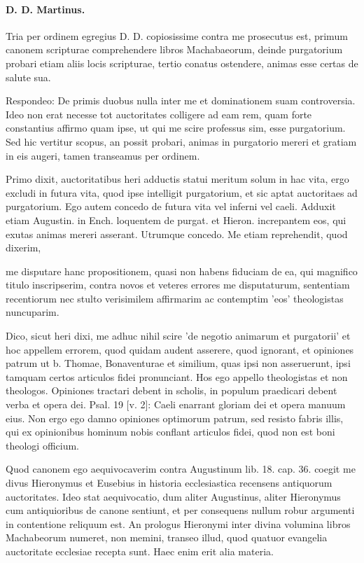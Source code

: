 \paragraph*{D. D. Martinus.}

Tria per ordinem egregius D. D. copiosissime contra me prosecutus est, primum canonem scripturae comprehendere libros Machabaeorum, deinde purgatorium probari etiam aliis locis scripturae, tertio conatus ostendere, animas esse certas de salute sua.

Respondeo: De primis duobus nulla inter me et dominationem suam controversia. Ideo non erat necesse tot auctoritates colligere ad eam \marginpar{\small[329]} rem, quam forte constantius affirmo quam ipse, ut qui me scire professus sim, esse purgatorium. Sed hic vertitur scopus, an possit probari, animas in purgatorio mereri et gratiam in eis augeri, tamen transeamus per ordinem.

Primo dixit, auctoritatibus heri adductis statui meritum solum in hac vita, ergo excludi in futura vita, quod ipse intelligit purgatorium, et sic aptat auctoritaes ad purgatorium. Ego autem concedo de futura vita vel inferni vel caeli. Adduxit etiam Augustin. in Ench. loquentem de purgat. et Hieron. increpantem eos, qui exutas animas mereri asserant. Utrumque concedo. Me etiam reprehendit, quod dixerim,

me disputare hanc propositionem, quasi non habens fiduciam de ea, qui magnifico titulo inscripserim, contra novos et veteres errores me disputaturum, sententiam recentiorum nec stulto verisimilem affirmarim ac contemptim 'eos' theologistas nuncuparim.

Dico, sicut heri dixi, me adhuc nihil scire 'de negotio animarum et purgatorii' et hoc appellem errorem, quod quidam audent asserere, quod ignorant, et opiniones patrum ut b. Thomae, Bonaventurae et similium, quas ipsi non asseruerunt, ipsi tamquam certos articulos fidei pronunciant. Hos ego appello theologistas et non theologos. Opiniones tractari debent in scholis, in populum praedicari debent verba et opera dei. Psal. 19 [v. 2]: Caeli enarrant gloriam dei et opera manuum eius. Non ergo ego damno opiniones optimorum patrum, sed resisto fabris illis, qui ex opinionibus hominum nobis conflant articulos fidei, quod non est boni theologi officium.

Quod canonem ego aequivocaverim contra Augustinum lib. 18. cap. 36. coegit me divus Hieronymus et Eusebius in historia ecclesiastica recensens antiquorum auctoritates. Ideo stat aequivocatio, dum aliter Augustinus, aliter Hieronymus cum antiquioribus de canone sentiunt, et per consequens nullum robur argumenti in contentione reliquum est. An prologus Hieronymi inter divina volumina libros Machabeorum numeret, non memini, transeo illud, quod quatuor evangelia auctoritate ecclesiae recepta sunt. Haec enim erit alia materia.

